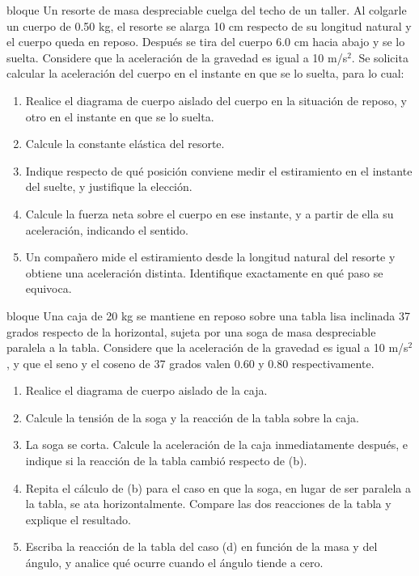 \documentclass[11pt,openany]{book}
\begin{document}
\begin{ejercicio}{bloque}
Un resorte de masa despreciable cuelga del techo de un taller. Al colgarle un cuerpo de 0.50 kg, el resorte se alarga 10 cm respecto de su longitud natural y el cuerpo queda en reposo. Después se tira del cuerpo 6.0 cm hacia abajo y se lo suelta. Considere que la aceleración de la gravedad es igual a 10 m/s$^2$. Se solicita calcular la aceleración del cuerpo en el instante en que se lo suelta, para lo cual:
\begin{enumerate}[label=(\alph*), leftmargin=1.7em, itemsep=1pt, topsep=3pt]
  \item Realice el diagrama de cuerpo aislado del cuerpo en la situación de reposo, y otro en el instante en que se lo suelta.
  \item Calcule la constante elástica del resorte.
  \item Indique respecto de qué posición conviene medir el estiramiento en el instante del suelte, y justifique la elección.
  \item Calcule la fuerza neta sobre el cuerpo en ese instante, y a partir de ella su aceleración, indicando el sentido.
  \item Un compañero mide el estiramiento desde la longitud natural del resorte y obtiene una aceleración distinta. Identifique exactamente en qué paso se equivoca.
\end{enumerate}
\end{ejercicio}

\begin{ejercicio}{bloque}
Una caja de 20 kg se mantiene en reposo sobre una tabla lisa inclinada 37 grados respecto de la horizontal, sujeta por una soga de masa despreciable paralela a la tabla. Considere que la aceleración de la gravedad es igual a 10 m/s$^2$, y que el seno y el coseno de 37 grados valen 0.60 y 0.80 respectivamente.
\begin{enumerate}[label=(\alph*), leftmargin=1.7em, itemsep=1pt, topsep=3pt]
  \item Realice el diagrama de cuerpo aislado de la caja.
  \item Calcule la tensión de la soga y la reacción de la tabla sobre la caja.
  \item La soga se corta. Calcule la aceleración de la caja inmediatamente después, e indique si la reacción de la tabla cambió respecto de (b).
  \item Repita el cálculo de (b) para el caso en que la soga, en lugar de ser paralela a la tabla, se ata horizontalmente. Compare las dos reacciones de la tabla y explique el resultado.
  \item Escriba la reacción de la tabla del caso (d) en función de la masa y del ángulo, y analice qué ocurre cuando el ángulo tiende a cero.
\end{enumerate}
\end{ejercicio}
\end{document}
